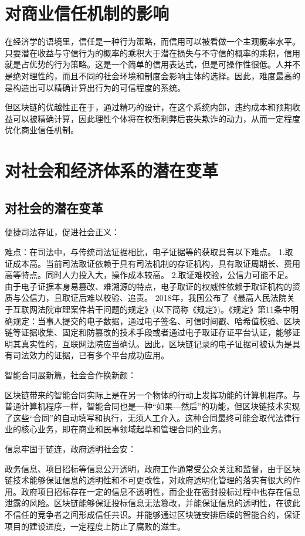 \section{对商业信任机制的影响}

在经济学的语境里，信任是一种行为策略，而信用可以被看做一个主观概率水平。只要潜在收益与守信行为的概率的乘积大于潜在损失与不守信的概率的乘积，信用就是占优势的行为策略。这是一个简单的信用表达式，但是可操作性很低。人并不是绝对理性的，而且不同的社会环境和制度会影响主体的选择。因此，难度最高的是构造出可以精确计算出行为的可信程度的系统。

但区块链的优越性正在于，通过精巧的设计，在这个系统内部，违约成本和预期收益可以被精确计算，因此理性个体将在权衡利弊后丧失欺诈的动力，从而一定程度优化商业信任机制。

\section{对社会和经济体系的潜在变革}

\subsection{对社会的潜在变革}

便捷司法存证，促进社会正义：

难点：在司法中，与传统司法证据相比，电子证据等的获取具有以下难点。
1.取证成本高。当前司法取证依赖于具有司法机制的存证机构，具有取证周期长、费用高等特点。同时人力投入大，操作成本较高。
2.取证难校验，公信力可能不足。由于电子证据本身易篡改、难溯源的特点，电子取证的权威性依赖于取证机构的资质与公信力，且取证后难以校验、追责。
2018年，我国公布了《最高人民法院关于互联网法院审理案件若干问题的规定》(以下简称《规定》)。《规定》第11条中明确规定：当事人提交的电子数据，通过电子签名、可信时间戳、哈希值校验、区块链等证据收集、固定和防篡改的技术手段或者通过电子取证存证平台认证，能够证明其真实性的，互联网法院应当确认。因此，区块链记录的电子证据可被认为是具有司法效力的证据，已有多个平台成功应用。

智能合同展新篇，社会合作换新颜：

区块链带来的智能合同实际上是在另一个物体的行动上发挥功能的计算机程序。与普通计算机程序一样，智能合同也是一种“如果—然后”的功能，但区块链技术实现了这些“合同”的自动填写和执行，无须人工介入。这种合同最终可能会取代法律行业的核心业务，即在商业和民事领域起草和管理合同的业务。

信息牢固于链连，政府透明社会安：

政务信息、项目招标等信息公开透明，政府工作通常受公众关注和监督，由于区块链技术能够保证信息的透明性和不可更改性，对政府透明化管理的落实有很大的作用。政府项目招标存在一定的信息不透明性，而企业在密封投标过程中也存在信息泄露的风险。区块链能够保证投标信息无法篡改，并能保证信息的透明性，在彼此不信任的竞争者之间形成信任共识。并能够通过区块链安排后续的智能合约，保证项目的建设进度，一定程度上防止了腐败的滋生。

